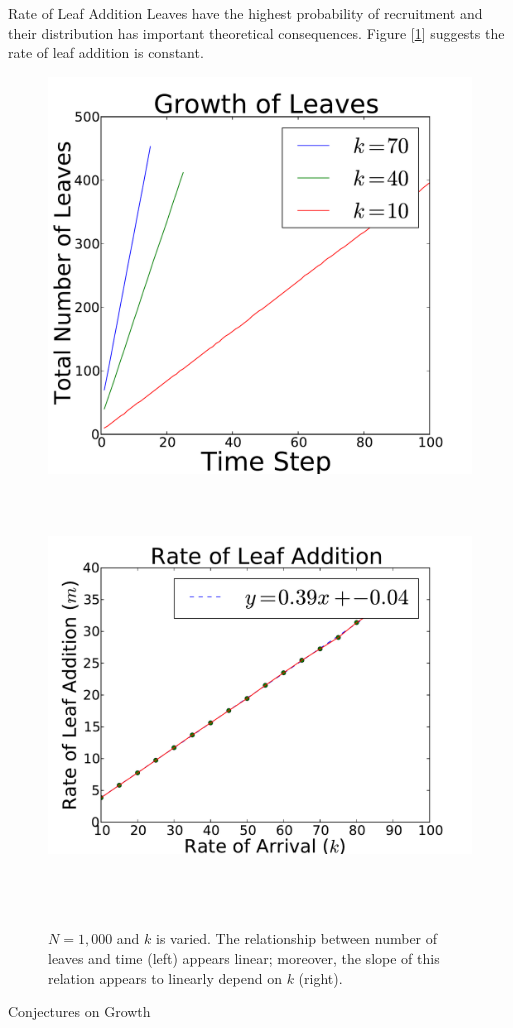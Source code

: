 \documentclass[final]{beamer}
\newlength{\onecolwid}
\begin{document}
\begin{frame}[t]
\begin{columns}[t]
\begin{column}{\onecolwid}
 \begin{block}{Rate of Leaf Addition} 
 Leaves have the highest probability of recruitment and their distribution has important theoretical consequences.  
 Figure [\ref{leaf}] suggests the rate of leaf addition is constant.
 \begin{figure}
\includegraphics[width=0.45\linewidth]{leaves_per_timestep.pdf}
\includegraphics[width=0.5\linewidth, height = 4.5in]{slope_arrival.pdf}
\caption{$N = 1,000$ and $k$ is varied.  The relationship between number of leaves and time (left) appears linear; moreover, the slope of this relation appears to linearly depend on $k$ (right).}
\label{leaf}
\end{figure}
\end{block}




\begin{block}{Conjectures on Growth}


\end{block}
\end{column}
\end{columns}
\end{frame}
\end{document}
